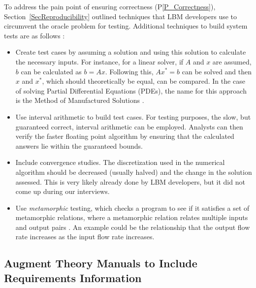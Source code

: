 \documentclass[final, 3p, times, authoryear]{elsarticle}
\newcommand{\ppref}[1]{P\ref{#1}}
\begin{document}
To address the pain point of ensuring correctness (\ppref{P_Correctness}),
Section~\ref{SecReproducibility} outlined techniques that LBM developers use to
circumvent the oracle problem for testing.  Additional techniques to build
system tests are as follows \citep{Smith2016}: 

\begin{itemize}

\item Create test cases by assuming a solution and using this solution to
  calculate the necessary inputs.  For instance, for a linear solver, if $A$ and
  $x$ are assumed, $b$ can be calculated as $b = A x$.  Following this, $A x^* =
  b$ can be solved and then $x$ and $x^*$, which should theoretically be equal,
  can be compared.  In the case of solving Partial Differential Equations
  (PDEs), the name for this approach is the Method of Manufactured Solutions
  \citep{Roache1998}.
\item Use interval arithmetic to build test cases.  For testing purposes, the
  slow, but guaranteed correct, interval arithmetic \citep{Hickey2001} can be
  employed. Analysts can then verify the faster floating point algorithm by
  ensuring that the calculated answers lie within the guaranteed bounds.
\item Include convergence studies.  The discretization used in the numerical
  algorithm should be decreased (usually halved) and the change in the solution
  assessed.  This is very likely already done by LBM developers, but it did not
  come up during our interviews.
\item Use \emph{metamorphic} testing, which checks a program to see if it
  satisfies a set of metamorphic relations, where a metamorphic relation relates
  multiple inputs and output pairs \citep{KanewalaAndLundgren2016}.  An example
  could be the relationship that the output flow rate increases as the input
  flow rate increases.
\end{itemize}

\subsection{Augment Theory Manuals to Include Requirements Information} \label{Sec_AugTheoryMans}
\end{document}
